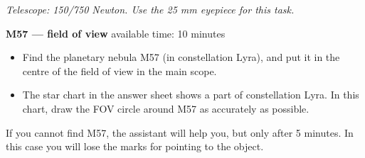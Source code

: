 \emph{Telescope: 150/750 Newton. Use the 25 mm eyepiece for this task.}

\textbf{M57 --- field of view} \hfill available time: 10 minutes

\begin{itemize}
\item Find the planetary nebula M57 (in constellation Lyra), and put it in
  the centre of the field of view in the main scope.
\item The star chart in the answer sheet shows a part of constellation Lyra.
  In this chart, draw the FOV circle around M57 as accurately as possible.
\end{itemize}

If you cannot find M57, the assistant will help you, but only after 5
minutes. In this case you will lose the marks for pointing to the object.

